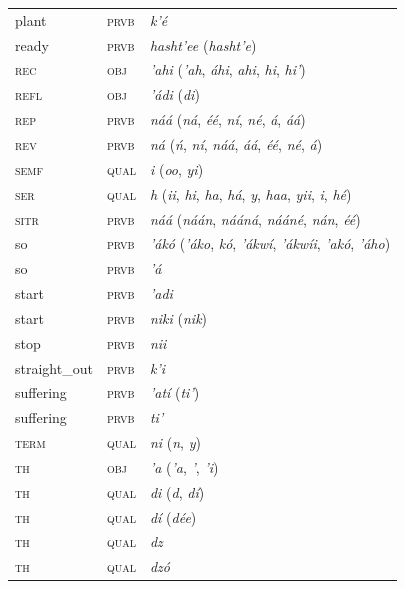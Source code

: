 \begin{xltabular}{\textwidth}{llX}
 plant & \textsc{prvb} & \textit{k’é}\\
 ready & \textsc{prvb} & \textit{hasht’ee} (\textit{hasht’e})\\
 \textsc{rec} & \textsc{obj} & \textit{’ahi} (\textit{’ah}, \textit{áhi}, \textit{ahi}, \textit{hi}, \textit{hi’})\\
 \textsc{refl} & \textsc{obj} & \textit{’ádi} (\textit{di})\\
 \textsc{rep} & \textsc{prvb} & \textit{náá} (\textit{ná}, \textit{éé}, \textit{ní}, \textit{né}, \textit{á}, \textit{áá})\\
 \textsc{rev} & \textsc{prvb} & \textit{ná} (\textit{ń}, \textit{ní}, \textit{náá}, \textit{áá}, \textit{éé}, \textit{né}, \textit{á})\\
 \textsc{semf} & \textsc{qual} & \textit{i} (\textit{oo}, \textit{yi})\\
 \textsc{ser} & \textsc{qual} & \textit{h} (\textit{ii}, \textit{hi}, \textit{ha}, \textit{há}, \textit{y}, \textit{haa}, \textit{yii}, \textit{i}, \textit{hé})\\
 \textsc{sitr} & \textsc{prvb} & \textit{náá} (\textit{náán}, \textit{nááná}, \textit{nááné}, \textit{nán}, \textit{éé})\\
 so & \textsc{prvb} & \textit{’ákó} (\textit{’áko}, \textit{kó}, \textit{’ákwí}, \textit{’ákwíi}, \textit{’akó}, \textit{’áho})\\
 so & \textsc{prvb} & \textit{’á}\\
 start & \textsc{prvb} & \textit{’adi}\\
 start & \textsc{prvb} & \textit{niki} (\textit{nik})\\
 stop & \textsc{prvb} & \textit{nii}\\
 straight\_out & \textsc{prvb} & \textit{k’i}\\
 suffering & \textsc{prvb} & \textit{’atí} (\textit{ti’})\\
 suffering & \textsc{prvb} & \textit{ti’}\\
 \textsc{term} & \textsc{qual} & \textit{ni} (\textit{n}, \textit{y})\\
 \textsc{th} & \textsc{obj} & \textit{’a} (\textit{’a}, \textit{’}, \textit{’i})\\
 \textsc{th} & \textsc{qual} & \textit{di} (\textit{d}, \textit{dí})\\
 \textsc{th} & \textsc{qual} & \textit{dí} (\textit{dée})\\
 \textsc{th} & \textsc{qual} & \textit{dz}\\
 \textsc{th} & \textsc{qual} & \textit{dzó}\\

\end{xltabular}
